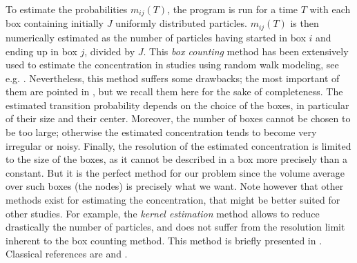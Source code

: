 To estimate the probabilities $m_{ij}(T)$, the program is run for a time $T$ with each box containing initially $J$ uniformly distributed particles. $m_{ij}(T)$ is then numerically estimated as the number of particles having started in box $i$ and ending up in box $j$, divided by $J$. This \textit{box counting} method has been extensively used to estimate the concentration in studies using random walk modeling, see e.g. \cite{riddle1998specification}. Nevertheless, this method suffers some drawbacks; the most important of them are pointed in \cite{spivakovskaya2007lagrangian}, but we recall them here for the sake of completeness. The estimated transition probability depends on the choice of the boxes, in particular of their size and their center. Moreover, the number of boxes cannot be chosen to be too large; otherwise the estimated concentration tends to become very irregular or noisy. Finally, the resolution of the estimated concentration is limited to the size of the boxes, as it cannot be described in a box more precisely than a constant. But it is the perfect method for our problem since the volume average over such boxes (the nodes) is precisely what we want. Note however that other methods exist for estimating the concentration, that might be better suited for other studies. For example, the \textit{kernel estimation} method allows to reduce drastically the number of particles, and does not suffer from the resolution limit inherent to the box counting method. This method is briefly presented in \cite{spivakovskaya2007lagrangian}. Classical references are \cite{silverman1986density} and \cite{wand1995kernel}.


